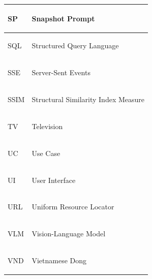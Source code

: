 \begin{xltabular}{\textwidth}{|>{\bfseries\raggedright\arraybackslash}p{0.22\textwidth}|>{\raggedright\arraybackslash}X|}
\hline
SP & Snapshot Prompt \\
\hline
SQL & Structured Query Language \\
\hline
SSE & Server-Sent Events \\
\hline
SSIM & Structural Similarity Index Measure \\
\hline
TV & Television \\
\hline
UC & Use Case \\
\hline
UI & User Interface \\
\hline
URL & Uniform Resource Locator \\
\hline
VLM & Vision-Language Model \\
\hline
VND & Vietnamese Dong \\
\hline
\end{xltabular}
\clearpage
